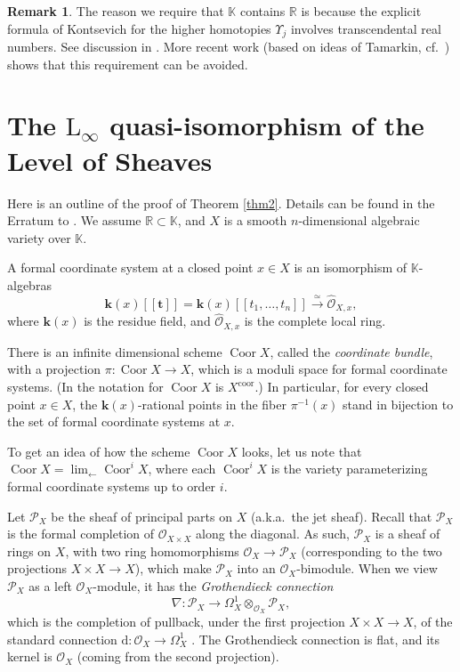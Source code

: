 \documentclass{conm-p-l}
\theoremstyle{definition}
\newtheorem{rem}[equation]{Remark}
\numberwithin{equation}{section}
\newcommand{\iso}{\stackrel{\simeq}{\longrightarrow}}
\newcommand{\opn}{\operatorname}
\newcommand{\mcal}[1]{\mathcal{#1}}
\newcommand{\mrm}[1]{\mathrm{#1}}
\newcommand{\mbb}[1]{\mathbb{#1}}
\newcommand{\bsym}[1]{\boldsymbol{#1}}
\newcommand{\what}{\widehat}
\renewcommand{\d}{\mathrm{d}}
\newcommand{\K}{\mbb{K}}
\newcommand{\R}{\mbb{R}}
\begin{document}
\begin{rem}
The reason we require that $\K$ contains $\R$ is because the explicit formula
of Kontsevich for the higher homotopies $\Upsilon_j$ involves transcendental
real numbers. See discussion in \cite{Ko2}. More recent work (based on ideas of
Tamarkin, cf.\ \cite{CV2}) shows that this requirement can be avoided.
\end{rem}





\section{The $\mrm{L}_{\infty}$ quasi-isomorphism of the Level of 
Sheaves}

Here is an outline of the proof of Theorem \ref{thm2}.
Details can be found in the Erratum to \cite{Ye1}. 
We assume $\mbb{R} \subset \K$, and $X$ is a smooth $n$-dimensional
algebraic variety over $\K$.

A formal coordinate system at a closed point 
$x \in X$ is an isomorphism of $\K$-algebras
\[ \bsym{k}(x)[[\bsym{t}]] = 
\bsym{k}(x)[[t_1, \ldots, t_n]] \iso \what{\mcal{O}}_{X, x}
, \]
where $\bsym{k}(x)$ is the residue field, and 
$\what{\mcal{O}}_{X, x}$ is the complete local ring.
 
There is an infinite dimensional scheme 
$\opn{Coor} X$, called the {\em coordinate bundle}, with a projection 
$\pi : \opn{Coor} X \to X$, which is a moduli space for
formal coordinate systems. (In \cite{Ko1} the notation for 
$\opn{Coor} X$ is $X^{\mrm{coor}}$.)
In particular, for every closed 
point $x \in X$, the $\bsym{k}(x)$-rational points 
in the fiber $\pi^{-1}(x)$ stand in bijection to 
the set of formal coordinate systems at $x$.

To get an idea of how the scheme $\opn{Coor} X$ looks, let us note 
that 
$\opn{Coor} X = \opn{lim}_{\leftarrow} \opn{Coor}^i X$,
where each $\opn{Coor}^i X$ is the variety 
parameterizing formal coordinate systems up to order $i$. 

Let $\mcal{P}_X$ be the sheaf of principal
parts on $X$ (a.k.a.\ the jet sheaf). Recall that $\mcal{P}_X$
is the formal completion of 
$\mcal{O}_{X \times X}$ along the diagonal. As such, $\mcal{P}_X$ is a sheaf 
of rings on $X$, with two ring homomorphisms 
$\mcal{O}_X \to \mcal{P}_X$ (corresponding to the two projections 
$X \times X \to X$), which make $\mcal{P}_X$ into an 
$\mcal{O}_X$-bimodule. When we view $\mcal{P}_X$ as a left $\mcal{O}_X$-module,
it has the  {\em Grothendieck connection}
\[ \nabla : \mcal{P}_X \to \Omega^1_X \otimes_{\mcal{O}_X} \mcal{P}_X , \]
which is the completion of pullback, under the first projection 
$X \times X \to X$, of the standard connection 
$\d : \mcal{O}_X \to \Omega^1_X$ . The Grothendieck connection is flat, and its
kernel is
$\mcal{O}_X$ (coming from the second projection). 
\end{document}
